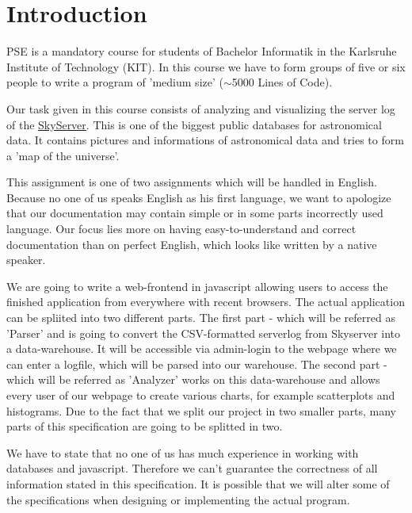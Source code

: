 \section*{Introduction}
PSE is a mandatory course for students of Bachelor Informatik in the 
Karlsruhe Institute of Technology (KIT). 
In this course we have to form groups of five or six people to write
 a program of 'medium size' ($\sim$5000 Lines of Code).

Our task given in this course consists of
analyzing and visualizing the server log of the 
\href{http://skyserver.sdss.org/public/en/}{SkyServer}.
This is one of the biggest public databases for astronomical data. 
It contains pictures and informations of astronomical data
and tries to form a 'map of the universe'.

This assignment is one of two assignments which will be handled 
in English.
Because no one of us speaks English as his first language, 
we want to apologize that our documentation may contain simple 
or in some parts incorrectly used language. Our focus lies more on 
having easy-to-understand and correct documentation 
than on perfect English, which looks like written by a native speaker.

We are going to write a web-frontend in javascript allowing users 
to access the finished application from everywhere
with recent browsers. The actual application can be spliited into two 
different parts. The first part - which will be referred as 'Parser' and is going to convert the CSV-formatted 
serverlog from Skyserver into a data-warehouse. It will
be accessible via admin-login to the webpage where we can enter a 
logfile, which will be parsed into our warehouse.
The second part - which will be referred as 'Analyzer' works on this data-warehouse 
and allows every user of our webpage to create various charts, 
for example scatterplots and histograms.
Due to the fact that we split our project in two smaller parts, 
many parts of this specification are going to be splitted in two.

We have to state that no one of us has much experience in working 
with databases and javascript.
Therefore we can't guarantee the correctness of all information 
stated in this specification.
It is possible that we will alter some of the specifications when designing or 
implementing the actual program.
